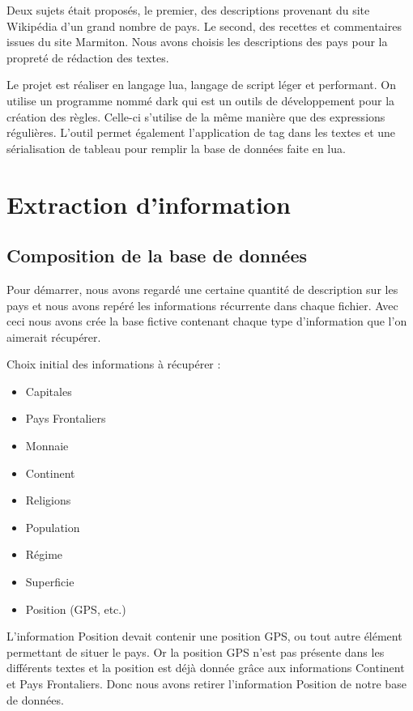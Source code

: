 \documentclass[11pt,a4paper]{article}
\begin{document}
Deux sujets était proposés, le premier, des descriptions provenant du site Wikipédia d'un grand nombre de pays. Le second, des recettes et commentaires issues du site Marmiton. Nous avons choisis les descriptions des pays pour la propreté de rédaction des textes.

Le projet est réaliser en langage lua, langage de script léger et performant. On utilise un programme nommé dark qui est un outils de développement pour la création des règles. Celle-ci s'utilise de la même manière que des expressions régulières. L'outil permet également l'application de tag dans les textes et une sérialisation de tableau pour remplir la base de données faite en lua. 


\clearpage

\section{Extraction d'information}

\subsection{Composition de la base de données}

Pour démarrer, nous avons regardé une certaine quantité de description sur les pays et nous avons repéré les informations récurrente dans chaque fichier. Avec ceci nous avons crée la base fictive contenant chaque type d'information que l'on aimerait récupérer.

Choix initial des informations à récupérer :
\begin{itemize}
	\item Capitales
	\item Pays Frontaliers
	\item Monnaie
	\item Continent
	\item Religions
	\item Population
	\item Régime
	\item Superficie
	\item Position (GPS, etc.)
\end{itemize}

L'information Position devait contenir une position GPS, ou tout autre élément permettant de situer le pays. Or la position GPS n'est pas présente dans les différents textes et la position est déjà donnée grâce aux informations Continent et Pays Frontaliers. Donc nous avons retirer l'information Position de notre base de données.
\end{document}

